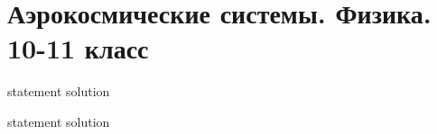 \chapter{Аэрокосмические системы. Физика. 10-11 класс}

{statement}
{solution}

{statement}
{solution}
